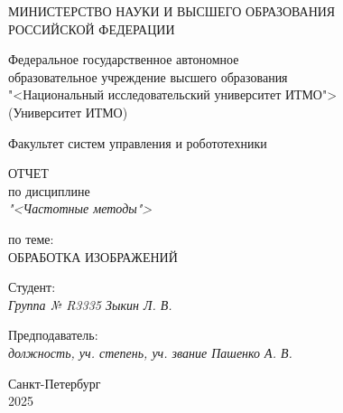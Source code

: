 \thispagestyle{empty}

\begin{center}
    МИНИСТЕРСТВО НАУКИ И ВЫСШЕГО ОБРАЗОВАНИЯ \\ РОССИЙСКОЙ ФЕДЕРАЦИИ

    \vspace{20pt}

    Федеральное государственное автономное \\ образовательное учреждение высшего образования \\
    "<Национальный исследовательский университет ИТМО"> \\
    (Университет ИТМО)

    \vspace{20pt}

    Факультет систем управления и робототехники
\end{center}

\vfill

\begin{center}
    ОТЧЕТ \\  
    по дисциплине \\
    \textit{"<Частотные методы">}

    \vspace{20pt}

    по теме: \\
    \uppercase{Обработка изображений}
\end{center}

\vfill

    \noindent Студент: \\
    \textit{Группа № R3335 \hfill Зыкин Л. В.}

    \vspace{20pt}

    \noindent Предподаватель: \\
    \textit{должность, уч. степень, уч. звание \hfill Пашенко А. В.}

\vfill

\begin{center}
    Санкт-Петербург \\ 2025
\end{center}